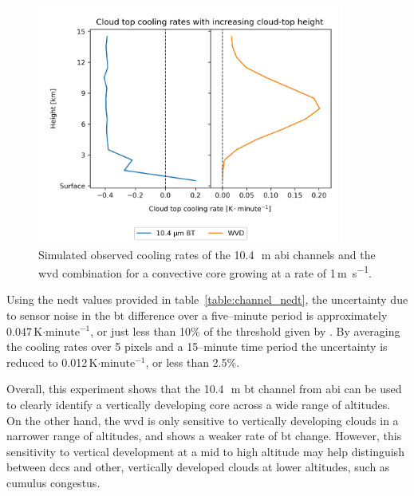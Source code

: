 \begin{figure}[tp]
    \includegraphics[width=0.9\textwidth]{figures/chapter1_07.png}
    \caption[
    Simulated observed cooling rates of the 10.4\,\unit{\mu m} \acrshort{abi} channels and the \acrshort{wvd} combination for a convective core growing at a rate of 1\,\unit{m s^{-1}}
    ]{
    Simulated observed cooling rates of the 10.4\,\unit{\mu m} \acrshort{abi} channels and the \acrshort{wvd} combination for a convective core growing at a rate of 1\,\unit{m s^{-1}}.
    }
    \label{fig:cloud_height_cooling_rates}
\end{figure}

Using the \acrshort{nedt} values provided in table~\ref{table:channel_nedt}, the uncertainty due to sensor noise in the \acrshort{bt} difference over a five--minute period is approximately 0.047\,K$\cdot \mathrm{minute^{-1}}$, or just less than 10\% of the threshold given by \citet{roberts_nowcasting_2003}.
By averaging the cooling rates over 5 pixels and a 15--minute time period the uncertainty is reduced to 0.012\,K$\cdot \mathrm{minute^{-1}}$, or less than 2.5\%.

Overall, this experiment shows that the 10.4\,\unit{\mu m} \acrshort{bt} channel from \acrshort{abi} can be used to clearly identify a vertically developing core across a wide range of altitudes.
On the other hand, the \acrshort{wvd} is only sensitive to vertically developing clouds in a narrower range of altitudes, and shows a weaker rate of \acrshort{bt} change.
However, this sensitivity to vertical development at a mid to high altitude may help distinguish between \acrshort{dcc}s and other, vertically developed clouds at lower altitudes, such as cumulus congestus.

